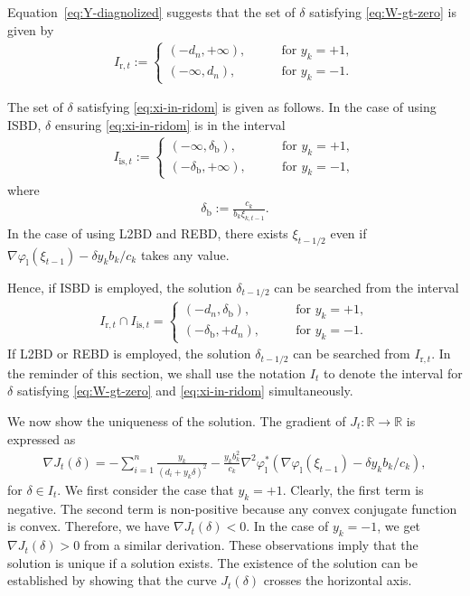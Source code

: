 \documentclass[10pt,onecolumn]{article}
\theoremstyle{definition}
\theoremstyle{definition}
\theoremstyle{definition}
\theoremstyle{definition}
\theoremstyle{definition}
\theoremstyle{theorem}
\newcommand{\0}{{\bm{0}}}
\newcommand{\1}{{\bm{1}}}
\newcommand{\bR}{{\mathbb{R}}}
\begin{document}
Equation~\eqref{eq:Y-diagnolized} suggests that 
the set of $\delta$ satisfying \eqref{eq:W-gt-zero}
is given by
%
\begin{align}\label{eq:int-nlrsys-for-upd-alph}
I_{\text{r},t} := 
\begin{cases}
( -d_{n},+\infty ), &\qquad \text{for $y_{k}=+1$}, 
\\
( -\infty, d_{n} ), &\qquad \text{for $y_{k}=-1$}. 
\end{cases}
\end{align}

The set of $\delta$ satisfying \eqref{eq:xi-in-ridom} is given
as follows.  In the case of using ISBD,
$\delta$ ensuring \eqref{eq:xi-in-ridom} is in
the interval
%
\begin{align*}
I_{\text{is},t} := 
\begin{cases}
( -\infty, \delta_{\text{b}} ), &\qquad \text{for $y_{k}=+1$}, 
\\
( -\delta_{\text{b}}, +\infty ), &\qquad \text{for $y_{k}=-1$}, 
\end{cases}
\end{align*}
where 
\begin{align*}
  \delta_{\text{b}} := \frac{c_{k}}{b_{k}\xi_{k,t-1}}. 
\end{align*}
In the case of using L2BD and REBD, there exists $\xi_{t-1/2}$ even if
$\nabla\varphi_{\text{l}}(\xi_{t-1}) - \delta y_{k}b_{k}/c_{k}$ takes any value.

Hence, if ISBD is employed, the solution $\delta_{t-1/2}$ can be searched
from the interval
\begin{align*}
  I_{\text{r},t}\cap I_{\text{is},t} =
\begin{cases}
( -d_{n}, \delta_{\text{b}} ), &\qquad \text{for $y_{k}=+1$}, 
\\
( -\delta_{\text{b}}, +d_{n} ), &\qquad \text{for $y_{k}=-1$}. 
\end{cases}
\end{align*}
If L2BD or REBD is employed, 
the solution $\delta_{t-1/2}$ can be searched from $I_{\text{r},t}$.
In the reminder of this section, we shall use the notation $I_{t}$ to
denote the interval for $\delta$ satisfying \eqref{eq:W-gt-zero}
and \eqref{eq:xi-in-ridom} simultaneously.

We now show the uniqueness of the solution. The gradient of $J_{t}:\bR\to\bR$
is expressed as
%
\begin{align*}
  \nabla J_{t}(\delta)
  =
  -\sum_{i=1}^{n}\frac{y_{k}}{(d_{i}+y_{k}\delta)^{2}}
  -\frac{y_{k}b_{k}^{2}}{c_{k}}
  \nabla^{2}\varphi^{*}_{\text{l}}
  (\nabla\varphi_{\text{l}}(\xi_{t-1}) - \delta y_{k}b_{k}/c_{k}), 
\end{align*}
%
for $\delta\in I_{t}$.  We first consider the case that 
$y_{k}=+1$. Clearly, the first term is negative. 
The second term is non-positive because any convex conjugate function
is convex. Therefore, we have $\nabla J_{t}(\delta) < 0$.
In the case of $y_{k}=-1$, 
we get $\nabla J_{t}(\delta) > 0$ from a similar derivation. 
These observations imply that the solution is unique
if a solution exists.  The existence of the solution can be
established by showing that the curve $J_{t}(\delta)$ crosses
the horizontal axis.
\end{document}
